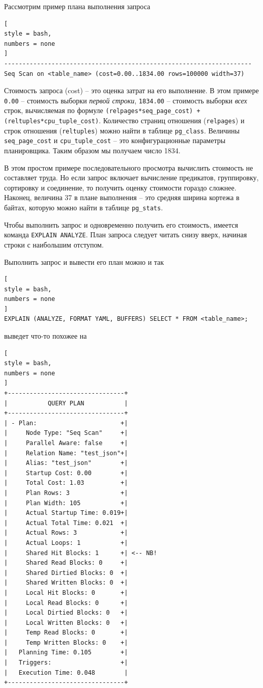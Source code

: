 \documentclass[%
	11pt,
	a4paper,
	utf8,
		]{article}
\begin{document}
Рассмотрим пример плана выполнения запроса
\begin{lstlisting}[
style = bash,
numbers = none
]
--------------------------------------------------------------------
Seq Scan on <table_name> (cost=0.00..1834.00 rows=100000 width=37)
\end{lstlisting}

Стоимость запроса (cost) -- это оценка затрат на его выполнение. В этом примере \texttt{0.00} -- стоимость выборки \emph{первой строки}, \texttt{1834.00} -- стоимость выборки \emph{всех} строк, вычисляемая по формуле \texttt{(relpages*seq\_page\_cost) + (reltuples*cpu\_tuple\_cost)}. Количество страниц отношения (\texttt{relpages}) и строк отношения (\texttt{reltuples}) можно найти в таблице \texttt{pg\_class}. Величины \texttt{seq\_page\_cost} и \texttt{cpu\_tuple\_cost} -- это конфигурационные параметры планировщика. Таким образом мы получаем число 1834.

В этом простом примере последовательного просмотра вычислить стоимость не составляет труда. Но если запрос включает вычисление предикатов, группировку, сортировку и соединение, то получить оценку стоимости гораздо сложнее. Наконец, величина 37 в плане выполнения -- это средняя ширина кортежа в байтах, которую можно найти в таблице \texttt{pg\_stats}. 

Чтобы выполнить запрос и одновременно получить его стоимость, имеется команда \texttt{EXPLAIN ANALYZE}. План запроса следует читать снизу вверх, начиная строки с наибольшим отступом.

Выполнить запрос и вывести его план можно и так
\begin{lstlisting}[
style = bash,
numbers = none
]
EXPLAIN (ANALYZE, FORMAT YAML, BUFFERS) SELECT * FROM <table_name>;
\end{lstlisting}

выведет что-то похожее на
\begin{lstlisting}[
style = bash,
numbers = none
]
+--------------------------------+
|           QUERY PLAN           |
+--------------------------------+
| - Plan:                       +|
|     Node Type: "Seq Scan"     +|
|     Parallel Aware: false     +|
|     Relation Name: "test_json"+|
|     Alias: "test_json"        +|
|     Startup Cost: 0.00        +|
|     Total Cost: 1.03          +|
|     Plan Rows: 3              +|
|     Plan Width: 105           +|
|     Actual Startup Time: 0.019+|
|     Actual Total Time: 0.021  +|
|     Actual Rows: 3            +|
|     Actual Loops: 1           +|
|     Shared Hit Blocks: 1      +| <-- NB!
|     Shared Read Blocks: 0     +|
|     Shared Dirtied Blocks: 0  +|
|     Shared Written Blocks: 0  +|
|     Local Hit Blocks: 0       +|
|     Local Read Blocks: 0      +|
|     Local Dirtied Blocks: 0   +|
|     Local Written Blocks: 0   +|
|     Temp Read Blocks: 0       +|
|     Temp Written Blocks: 0    +|
|   Planning Time: 0.105        +|
|   Triggers:                   +|
|   Execution Time: 0.048        |
+--------------------------------+
\end{lstlisting}
\end{document}
